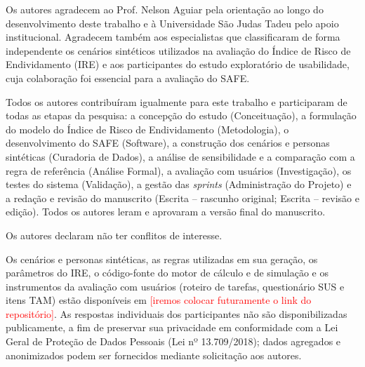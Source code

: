 \documentclass[portuguese]{sbc2025}%
\newcommand{\todo}[1]{\textcolor{red}{[#1]}}
\begin{document}
\begin{declarations}

\begin{acknowledgements}
Os autores agradecem ao Prof. Nelson Aguiar pela orientação ao longo do desenvolvimento deste trabalho e à Universidade São Judas Tadeu pelo apoio institucional. Agradecem também aos especialistas que classificaram de forma independente os cenários sintéticos utilizados na avaliação do Índice de Risco de Endividamento (IRE) e aos participantes do estudo exploratório de usabilidade, cuja colaboração foi essencial para a avaliação do SAFE.


\end{acknowledgements}

\begin{contributions}
Todos os autores contribuíram igualmente para este trabalho e participaram de todas as etapas da pesquisa: a concepção do estudo (Conceituação), a formulação do modelo do Índice de Risco de Endividamento (Metodologia), o desenvolvimento do SAFE (Software), a construção dos cenários e personas sintéticas (Curadoria de Dados), a análise de sensibilidade e a comparação com a regra de referência (Análise Formal), a avaliação com usuários (Investigação), os testes do sistema (Validação), a gestão das \textit{sprints} (Administração do Projeto) e a redação e revisão do manuscrito (Escrita – rascunho original; Escrita – revisão e edição). Todos os autores leram e aprovaram a versão final do manuscrito.
\end{contributions}

\begin{interests}
Os autores declaram não ter conflitos de interesse.

\end{interests}

\begin{materials}
Os cenários e personas sintéticas, as regras utilizadas em sua geração, os parâmetros do IRE, o código-fonte do motor de cálculo e de simulação e os instrumentos da avaliação com usuários (roteiro de tarefas, questionário SUS e itens TAM) estão disponíveis em \todo {iremos colocar futuramente o link do repositório}. As respostas individuais dos participantes não são disponibilizadas publicamente, a fim de preservar sua privacidade em conformidade com a Lei Geral de Proteção de Dados Pessoais (Lei nº 13.709/2018); dados agregados e anonimizados podem ser fornecidos mediante solicitação aos autores.\end{materials}


\end{declarations}
\end{document}
